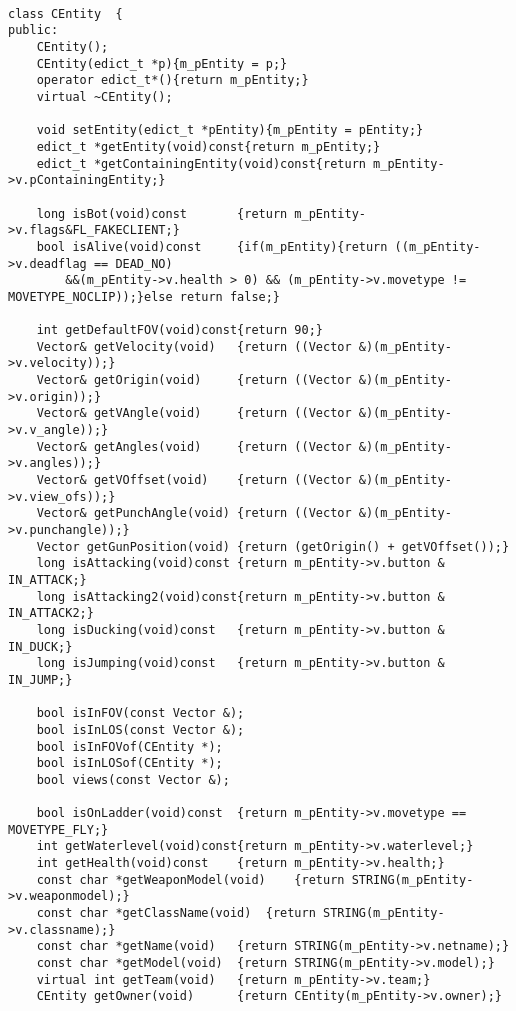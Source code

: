 \documentclass[12pt]{article}
\begin{document}
\scriptsize
\linespread{1.0}
\begin{verbatim}

class CEntity  {
public:
    CEntity();
    CEntity(edict_t *p){m_pEntity = p;}
    operator edict_t*(){return m_pEntity;}
    virtual ~CEntity();

    void setEntity(edict_t *pEntity){m_pEntity = pEntity;}
    edict_t *getEntity(void)const{return m_pEntity;}
    edict_t *getContainingEntity(void)const{return m_pEntity->v.pContainingEntity;}

    long isBot(void)const       {return m_pEntity->v.flags&FL_FAKECLIENT;}
    bool isAlive(void)const     {if(m_pEntity){return ((m_pEntity->v.deadflag == DEAD_NO)
        &&(m_pEntity->v.health > 0) && (m_pEntity->v.movetype != MOVETYPE_NOCLIP));}else return false;}

    int getDefaultFOV(void)const{return 90;}
    Vector& getVelocity(void)   {return ((Vector &)(m_pEntity->v.velocity));}
    Vector& getOrigin(void)     {return ((Vector &)(m_pEntity->v.origin));}
    Vector& getVAngle(void)     {return ((Vector &)(m_pEntity->v.v_angle));}
    Vector& getAngles(void)     {return ((Vector &)(m_pEntity->v.angles));}
    Vector& getVOffset(void)    {return ((Vector &)(m_pEntity->v.view_ofs));}
    Vector& getPunchAngle(void) {return ((Vector &)(m_pEntity->v.punchangle));}
    Vector getGunPosition(void) {return (getOrigin() + getVOffset());}
    long isAttacking(void)const {return m_pEntity->v.button & IN_ATTACK;}
    long isAttacking2(void)const{return m_pEntity->v.button & IN_ATTACK2;}
    long isDucking(void)const   {return m_pEntity->v.button & IN_DUCK;}
    long isJumping(void)const   {return m_pEntity->v.button & IN_JUMP;}

    bool isInFOV(const Vector &);
    bool isInLOS(const Vector &);
    bool isInFOVof(CEntity *);
    bool isInLOSof(CEntity *);
    bool views(const Vector &);

    bool isOnLadder(void)const  {return m_pEntity->v.movetype == MOVETYPE_FLY;}
    int getWaterlevel(void)const{return m_pEntity->v.waterlevel;}
    int getHealth(void)const    {return m_pEntity->v.health;}
    const char *getWeaponModel(void)    {return STRING(m_pEntity->v.weaponmodel);}
    const char *getClassName(void)  {return STRING(m_pEntity->v.classname);}
    const char *getName(void)   {return STRING(m_pEntity->v.netname);}
    const char *getModel(void)  {return STRING(m_pEntity->v.model);}
    virtual int getTeam(void)   {return m_pEntity->v.team;}
    CEntity getOwner(void)      {return CEntity(m_pEntity->v.owner);}


\end{verbatim}
\end{document}

